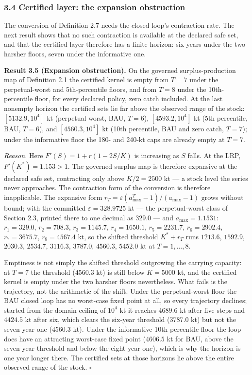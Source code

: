 \documentclass[11pt]{article}
\begin{document}
\subsubsection{3.4 Certified layer: the expansion
obstruction}\label{budget-certified-layer-the-expansion-obstruction}

The conversion of Definition 2.7 needs the closed loop's contraction
rate. The next result shows that no such contraction is available at the
declared safe set, and that the certified layer therefore has a finite
horizon: six years under the two harsher floors, seven under the
informative one.

\textbf{Result 3.5 (Expansion obstruction).} On the governed
surplus-production map of Definition 2.1 the certified kernel is empty
from \(T = 7\) under the perpetual-worst and 5th-percentile floors,
and from \(T = 8\) under the 10th-percentile floor, for every declared
policy, zero catch included. At the last nonempty horizon the certified
sets lie far above the observed range of the stock:
\([5132.9, 10^4]\) kt (perpetual worst, BAU, \(T = 6\)),
\([4593.2, 10^4]\) kt (5th percentile, BAU, \(T = 6\)), and
\([4560.3, 10^4]\) kt (10th percentile, BAU and zero catch,
\(T = 7\)); under the informative floor the 180- and 240-kt caps are
already empty at \(T = 7\).

\emph{Reason.} Here \(F'(S) = 1 + r(1-2S/K)\) is increasing as \(S\)
falls. At the LRP, \(F'(K^*) = 1.153 > 1\). The governed surplus map is
therefore expansive at the declared safe set, contracting only above
\(K/2 = 2500\) kt --- a stock level the series never approaches. The
contraction form of the conversion is therefore inapplicable. The
expansive form \(r_T = \varepsilon(a_{\max}^T - 1)/(a_{\max} - 1)\)
grows without bound; with the committed \(\varepsilon = 328.9725\) kt --- the
perpetual-worst class of Section 2.3, printed there to one decimal as
\(329.0\) --- and \(a_{\max} = 1.1531\): \(r_1 = 329.0\), \(r_2 = 708.3\),
\(r_3 = 1145.7\), \(r_4 = 1650.1\), \(r_5 = 2231.7\),
\(r_6 = 2902.4\), \(r_7 = 3675.7\), \(r_8 = 4567.4\) kt, so the
shifted threshold \(K^* + r_T\) runs \(1213.6\), \(1592.9\),
\(2030.3\), \(2534.7\), \(3116.3\), \(3787.0\), \(4560.3\),
\(5452.0\) kt at \(T = 1,\ldots,8\).

Emptiness is not simply the shifted threshold outgrowing the carrying
capacity: at \(T = 7\) the threshold (\(4560.3\) kt) is still below
\(K = 5000\) kt, and the certified kernel is empty under the two
harsher floors nevertheless. What fails is the trajectory, not the
arithmetic of the shift. Under the perpetual-worst floor the BAU closed
loop has no worst-case fixed point at all, so every trajectory declines;
started from the domain ceiling of \(10^4\) kt it reaches \(4689.6\)
kt after five steps and \(4424.5\) kt after six, which clears the
six-year threshold (\(3787.0\) kt) but not the seven-year one
(\(4560.3\) kt). Under the informative 10th-percentile floor the loop
does have an attracting worst-case fixed point (\(4606.5\) kt for BAU,
above the seven-year threshold and below the eight-year one), which is
why the horizon is one year longer there. The certified sets at those
horizons lie above the entire observed range of the stock. \ensuremath{\square}
\end{document}
